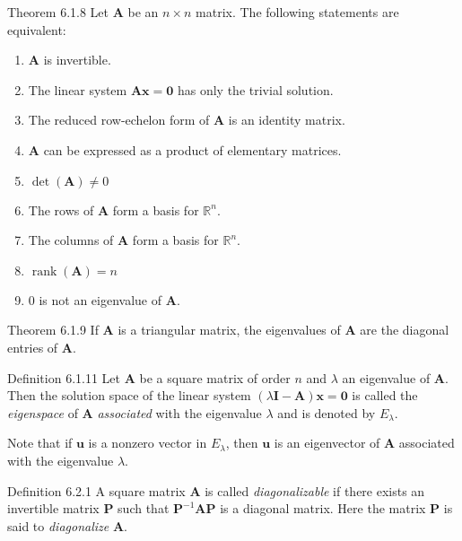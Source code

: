 \documentclass[10pt,landscape]{article}
\newcommand{\matr}[1]{\bm{#1}}
\newcommand{\vect}[1]{\bm{#1}}
\newcommand{\rank}{\operatorname{rank}}
\theoremstyle{definition}
\newcommand{\thistheoremname}{}
\newtheorem*{genericthm*}{\thistheoremname}
\newenvironment{namedthm*}[1]
{\renewcommand{\thistheoremname}{#1}\begin{genericthm*}}
{\end{genericthm*}}
\begin{document}
\begin{multicols}{3}
\begin{namedthm*}{Theorem 6.1.8}
    Let \(\matr{A}\) be an \(n \times n \) matrix. The following statements are equivalent:
    \begin{enumerate}
        \item \(\matr{A}\) is invertible.
        \item The linear system \(\matr{A}\vect{x} = \matr{0}\) has only the trivial solution.
        \item The reduced row-echelon form of \(\matr{A}\) is an identity matrix.
        \item \(\matr{A}\) can be expressed as a product of elementary matrices.
        \item \(\det(\matr{A}) \not= 0\)
        \item The rows of \(\matr{A}\) form a basis for \(\mathbb{R}^n\).
        \item The columns of \(\matr{A}\) form a basis for \(\mathbb{R}^n\).
        \item \(\rank(\matr{A}) = n\)
        \item \(0\) is not an eigenvalue of \(\matr{A}\).
    \end{enumerate}
\end{namedthm*}

\begin{namedthm*}{Theorem 6.1.9}
    If \(\matr{A}\) is a triangular matrix, the eigenvalues of \(\matr{A}\) are the diagonal entries of \(\matr{A}\).
\end{namedthm*}

\begin{namedthm*}{Definition 6.1.11}
    Let \(\matr{A}\) be a square matrix of order \(n\) and \(\lambda\) an eigenvalue of \(\matr{A}\). Then the solution space of the linear system \((\lambda\matr{I} - \matr{A})\vect{x} = \vect{0}\) is called the \textit{eigenspace} of \(\matr{A}\) \textit{associated} with the eigenvalue \(\lambda\) and is denoted by \(E_\lambda\).
    
    \medskip
    \noindent
    Note that if \(\vect{u}\) is a nonzero vector in \(E_\lambda\), then \(\vect{u}\) is an eigenvector of \(\matr{A}\) associated with the eigenvalue \(\lambda\).
\end{namedthm*}

\begin{namedthm*}{Definition 6.2.1}
    A square matrix \(\matr{A}\) is called \textit{diagonalizable} if there exists an invertible matrix \(\matr{P}\) such that \(\matr{P}^{-1}\matr{A}\matr{P}\) is a diagonal matrix. Here the matrix \(\matr{P}\) is said to \textit{diagonalize} \(\matr{A}\).
\end{namedthm*}


\end{multicols}
\end{document}
